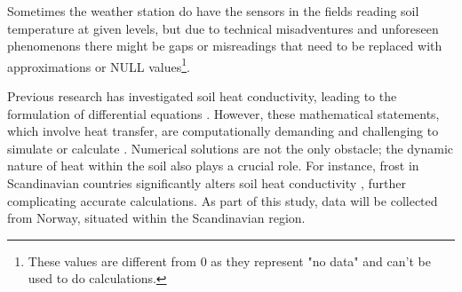 Sometimes the weather station do have the sensors in the fields reading soil temperature at given levels, but due to technical misadventures and unforeseen phenomenons there might be gaps or misreadings that need to be replaced with approximations or NULL values\footnote{These values are different from 0 as they represent "no data" and can't be used to do calculations.}.

Previous research has investigated soil heat conductivity, leading to the formulation of differential equations \cite{karvonen_model_1988}. However, these mathematical statements, which involve heat transfer, are computationally demanding and challenging to simulate or calculate \cite{fourier_analytical_2009, karvonen_model_1988}. Numerical solutions are not the only obstacle; the dynamic nature of heat within the soil also plays a crucial role. For instance, frost in Scandinavian countries significantly alters soil heat conductivity \cite{stuurop_influence_2022}, further complicating accurate calculations. As part of this study, data will be collected from Norway, situated within the Scandinavian region.




